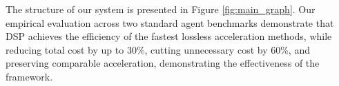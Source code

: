 
\setlength{\textfloatsep}{3pt plus 2pt minus 2pt}

The structure of our system is presented in Figure \ref{fig:main_graph}. Our empirical evaluation across two standard agent benchmarks demonstrate that DSP achieves the efficiency of the fastest lossless acceleration methods, while reducing total cost by up to 30\%, cutting unnecessary cost by 60\%, and preserving comparable acceleration, demonstrating the effectiveness of the framework. 


% 

